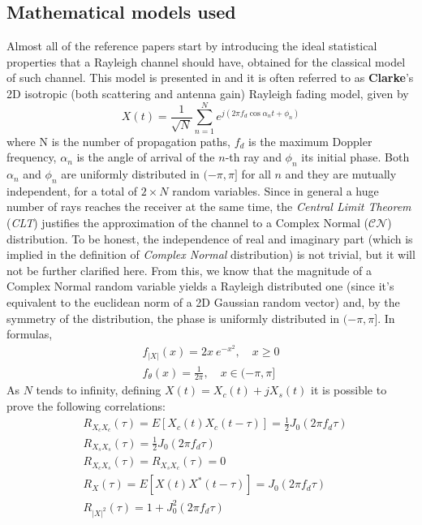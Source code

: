 \subsection{Mathematical models used} %
\label{subsec:math_models}

Almost all of the reference papers start by introducing the ideal statistical properties that a Rayleigh channel should have, obtained for the classical model of such channel. This model is presented in \cite{clarke} and it is often referred to as \textbf{Clarke}'s 2D isotropic (both scattering and antenna gain) Rayleigh fading model, given by%
%
\begin{equation}
X(t) = \frac{1}{\sqrt{N}} \sum_{n=1}^{N} e^{j(2\pi f_d \cos \alpha_n t + \phi_n)}
\end{equation}%
%
where N is the number of propagation paths, $f_d$ is the maximum Doppler frequency, $\alpha_n$ is the angle of arrival of the $n$-th ray and $\phi_n$ its initial phase. Both $\alpha_n$ and $\phi_n$ are uniformly distributed in $(-\pi,\pi]$ for all $n$ and they are mutually independent, for a total of $2 \times N$ random variables. Since in general a huge number of rays reaches the receiver at the same time, the \textit{Central Limit Theorem} (\textit{CLT}) justifies the approximation of the channel to a Complex Normal ($\mathcal{CN}$) distribution. To be honest, the independence of real and imaginary part (which is implied in the definition of \textit{Complex Normal} distribution) is not trivial, but it will not be further clarified here. From this, we know that the magnitude of a Complex Normal random variable yields a Rayleigh distributed one (since it's equivalent to the euclidean norm of a 2D Gaussian random vector) and, by the symmetry of the distribution, the phase is uniformly distributed in $(-\pi,\pi]$. In formulas,%
%
\begin{subequations} \label{eqs:pdfs}
\begin{align}
	f_{|X|}(x) = 2x \ e^{-x^2}, \quad x \geq 0\\
	f_{\theta}(x) = \frac{1}{2\pi}, \quad x \in (-\pi,\pi]
\end{align}
\end{subequations}%
%
As $N$ tends to infinity, defining $X(t) = X_c(t) + jX_s(t)$ it is possible to prove the following correlations:%
%
\begin{subequations}
	\label{eqs:correlations}
\begin{align}
&R_{X_cX_c}(\tau) = E[X_c(t)X_c(t-\tau)] = \frac{1}{2} J_0(2\pi f_d\tau)\\
&R_{X_sX_s}(\tau) = \frac{1}{2} J_0(2\pi f_d\tau)\\
&R_{X_cX_s}(\tau) = R_{X_sX_c}(\tau) = 0\\
&R_X(\tau) = E[X(t) X^*(t-\tau)] = J_0(2\pi f_d \tau)\\
&R_{|X|^2}(\tau) = 1 + J_0^2(2\pi f_d \tau)
\end{align}
\end{subequations}%
